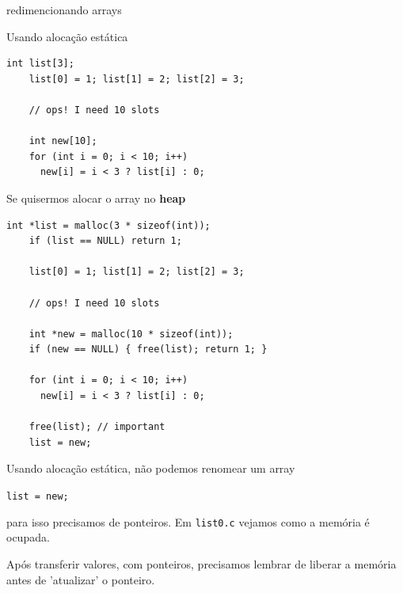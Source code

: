 \documentclass{beamer}
\begin{document}
\begin{frame}{redimencionando arrays}

  Usando alocação estática 

  \begin{lstlisting}[style=normalc,caption=src/list0.c]
    int list[3];
    list[0] = 1; list[1] = 2; list[2] = 3;
    
    // ops! I need 10 slots
    
    int new[10];
    for (int i = 0; i < 10; i++) 
      new[i] = i < 3 ? list[i] : 0;
  \end{lstlisting}

  \framebreak

  Se quisermos alocar o array no \textbf{heap} 

  \begin{lstlisting}[style=normalc,caption=src/list1.c]
    int *list = malloc(3 * sizeof(int));
    if (list == NULL) return 1;
    
    list[0] = 1; list[1] = 2; list[2] = 3;

    // ops! I need 10 slots
    
    int *new = malloc(10 * sizeof(int));
    if (new == NULL) { free(list); return 1; }
    
    for (int i = 0; i < 10; i++) 
      new[i] = i < 3 ? list[i] : 0;

    free(list); // important
    list = new;  
  \end{lstlisting}

  \framebreak

  Usando alocação estática, não podemos renomear um array

  {\color{red} \texttt{list = new;}}

  para isso precisamos de ponteiros. Em \texttt{list0.c} vejamos como
  a memória é ocupada.

  Após transferir valores, com ponteiros, precisamos lembrar de
  liberar a memória antes de 'atualizar' o ponteiro.

\end{frame}
\end{document}
